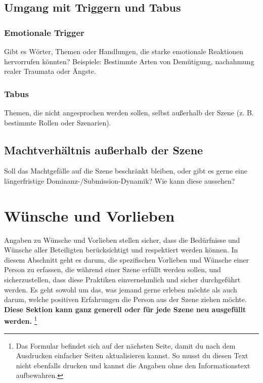 \documentclass[a4paper,12pt]{article}
\begin{document}
\newpage
\subsection{Umgang mit Triggern und Tabus}
\subsubsection{Emotionale Trigger}
\noindent
Gibt es Wörter, Themen oder Handlungen, die starke emotionale Reaktionen hervorrufen könnten? Beispiele: Bestimmte Arten von Demütigung, nachahmung realer Traumata oder Ängste.\newline
\noindent \TextField[name=TriggerEmotional,multiline=true,height=15em, width=37em]{}

\subsubsection{Tabus}
\noindent Themen, die nicht angesprochen werden sollen, selbst außerhalb der Szene (z. B. bestimmte Rollen oder Szenarien).\newline
\noindent \TextField[name=TriggerTabus,multiline=true,height=15em, width=37em]{}

\subsection{Machtverhältnis außerhalb der Szene}
\noindent Soll das Machtgefälle auf die Szene beschränkt bleiben, oder gibt es gerne eine längerfristige Dominanz-/Submission-Dynamik? Wie kann diese aussehen?\newline
\noindent \TextField[name=OutOfScene,multiline=true,height=8em, width=37em]{}

\newpage
\section{Wünsche und Vorlieben}
Angaben zu Wünsche und Vorlieben stellen sicher, dass die Bedürfnisse und Wünsche aller Beteiligten berücksichtigt und respektiert werden können. In diesem Abschnitt geht es darum, die spezifischen Vorlieben und Wünsche einer Person zu erfassen, die während einer Szene erfüllt werden sollen, und sicherzustellen, dass diese Praktiken einvernehmlich und sicher durchgeführt werden. Es geht sowohl um das, was jemand gerne erleben möchte als auch darum, welche positiven Erfahrungen die Person aus der Szene ziehen möchte. \textbf{Diese Sektion kann ganz generell oder für jede Szene neu ausgefüllt werden.} \footnote{Das Formular befindet sich auf der nächsten Seite, damit du nach dem Ausdrucken einfacher Seiten aktualisieren kannst. So musst du diesen Text nicht ebenfalls drucken und kannst die Angaben ohne den Informationstext aufbewahren.}
\end{document}
